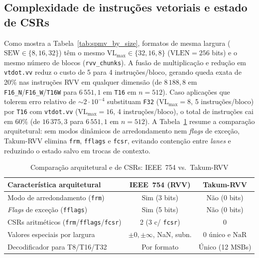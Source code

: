 \documentclass[journal]{IEEEtran}
\begin{document}
\subsection{Complexidade de instruções vetoriais e estado de CSRs}
Como mostra a Tabela~\ref{tab:spmv_by_size}, formatos de mesma largura
($\mathrm{SEW} \in \{8, 16, 32\}$) têm o mesmo $\mathrm{VL}_{\max} \in
\{32, 16, 8\}$ ($\mathrm{VLEN}=256$ bits) e o mesmo número de blocos
(\texttt{rvv\_chunks}). A fusão de multiplicação e redução em \texttt{vtdot.vv}
reduz o custo de 5 para 4 instruções/bloco, gerando queda exata de 20\% nas
instruções RVV em qualquer dimensão (de $8\,188{,}8$ em
\texttt{F16\_N}/\texttt{F16\_W}/\texttt{T16W} para $6\,551{,}1$ em \texttt{T16}
em $n=512$). Caso aplicações que tolerem erro relativo de $\sim 2\cdot 10^{-4}$
substituam \texttt{F32} ($\mathrm{VL}_{\max}=8$, 5 instruções/bloco) por
\texttt{T16} com \texttt{vtdot.vv} ($\mathrm{VL}_{\max}=16$, 4
instruções/bloco), o total de instruções cai em 60\% (de $16\,375{,}3$ para
$6\,551{,}1$ em $n=512$). A Tabela~\ref{tab:csr} resume a comparação
arquitetural: sem modos dinâmicos de arredondamento nem \emph{flags} de
exceção, Takum-RVV elimina \texttt{frm}, \texttt{fflags} e \texttt{fcsr},
evitando contenção entre \emph{lanes} e reduzindo o estado salvo em trocas de
contexto.

\begin{table}[!t]
\renewcommand{\arraystretch}{1.08}
\setlength{\tabcolsep}{2.5pt}
\caption{Comparação arquitetural e de CSRs: IEEE~754 vs.\ Takum-RVV}
\label{tab:csr}
\centering
\scriptsize
\begin{tabular}{l c c}
\hline
Característica arquitetural & IEEE~754 (RVV) & Takum-RVV \\
\hline
Modo de arredondamento (\texttt{frm}) & Sim (3 bits) & Não (0 bits) \\
\emph{Flags} de exceção (\texttt{fflags}) & Sim (5 bits) & Não (0 bits) \\
CSRs aritméticos (\texttt{frm}/\texttt{fflags}/\texttt{fcsr}) & 2 (3 c/ \texttt{fcsr}) & 0 \\
Valores especiais por largura & $\pm 0, \pm\infty$, NaN, subn. & $0$ único e $\mathrm{NaR}$ \\
Decodificador para T8/T16/T32 & Por formato & Único (12 MSBs) \\
\hline
\end{tabular}
\end{table}
\end{document}
